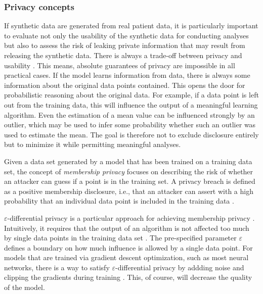 \documentclass[12pt]{article}
\begin{document}
\subsubsection{Privacy concepts}\label{privacyconcepts}
If synthetic data are generated from real patient data, it is particularly important to evaluate not only the usability of the synthetic data for conducting analyses but also to assess the risk of leaking private information that may result from releasing the synthetic data.
There is always a trade-off between privacy and usability \citep{dinur_revealing_2003, kifer_no_2011}.
This means, absolute guarantees of privacy are impossible in all practical cases.
If the model learns information from data, there is always some information about the original data points contained.
This opens the door for probabilistic reasoning about the original data.
For example, if a data point is left out from the training data, this will influence the output of a meaningful learning algorithm.
Even the estimation of a mean value can be influenced strongly by an outlier, which may be used to infer some probability whether such an outlier was used to estimate the mean.
The goal is therefore not to exclude disclosure entirely but to minimize it while permitting meaningful analyses.

Given a data set generated by a model that has been trained on a training data set, the concept of {\em membership privacy} \citep{li_membership_2013} focuses on describing the risk of whether an attacker can guess if a point is in the training set.
A privacy breach is defined as a positive membership disclosure, i.e., that an attacker can assert with a high probability that an individual data point is included in the training data \citep{li_membership_2013}.

$\varepsilon$-differential privacy is a particular approach for achieving membership privacy \citep{dwork_differential_2008}.
Intuitively, it requires that the output of an algorithm is not affected too much by single data points in the training data set \citep{li_membership_2013}.
The pre-specified parameter $\varepsilon$ defines a boundary on how much influence is allowed by a single data point.
For models that are trained via gradient descent optimization, such as most neural networks, there is a way to satisfy $\varepsilon$-differential privacy by addding noise and clipping the gradients during training \citep{abadi_deep_2016}.
This, of course, will decrease the quality of the model.
\end{document}
